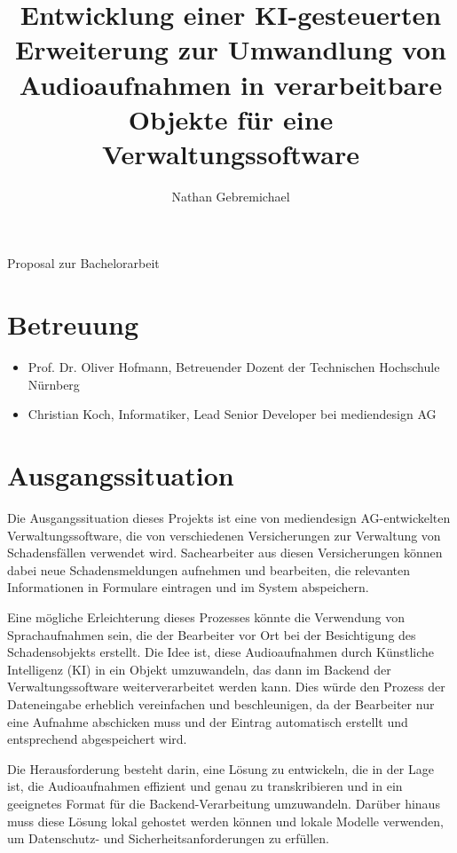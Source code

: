 \documentclass[12pt,a4paper,parskip=full]{scrartcl}
\title{Entwicklung einer KI-gesteuerten Erweiterung zur Umwandlung von Audioaufnahmen in verarbeitbare Objekte für eine Verwaltungssoftware}
\author{Nathan Gebremichael}
\date{}
\begin{document}
\makeatletter

{
    \centering
    {\Large Proposal zur Bachelorarbeit \par}
    \vspace*{1cm}
    {\LARGE \@title \par}
    \vspace*{2cm}
    {\large \@author \par}
}

\section*{Betreuung}
\begin{itemize}
    \item Prof. Dr. Oliver Hofmann, Betreuender Dozent der Technischen Hochschule Nürnberg
    \item Christian Koch, Informatiker, Lead Senior Developer bei mediendesign AG
\end{itemize}

\section*{Ausgangssituation}
Die Ausgangssituation dieses Projekts ist eine von mediendesign AG-entwickelten Verwaltungssoftware, die von verschiedenen Versicherungen zur Verwaltung von Schadensfällen verwendet wird.
Sachearbeiter aus diesen Versicherungen können dabei neue Schadensmeldungen aufnehmen und bearbeiten, die relevanten Informationen in Formulare eintragen und im System abspeichern.

Eine mögliche Erleichterung dieses Prozesses könnte die Verwendung von Sprachaufnahmen sein, die der Bearbeiter vor Ort bei der Besichtigung des Schadensobjekts erstellt.
Die Idee ist, diese Audioaufnahmen durch Künstliche Intelligenz (KI) in ein Objekt umzuwandeln, das dann im Backend der Verwaltungssoftware weiterverarbeitet werden kann.
Dies würde den Prozess der Dateneingabe erheblich vereinfachen und beschleunigen, da der Bearbeiter nur eine Aufnahme abschicken muss und der Eintrag automatisch erstellt und entsprechend abgespeichert wird.

Die Herausforderung besteht darin, eine Lösung zu entwickeln, die in der Lage ist, die Audioaufnahmen effizient und genau zu transkribieren und in ein geeignetes Format für die Backend-Verarbeitung umzuwandeln.
Darüber hinaus muss diese Lösung lokal gehostet werden können und lokale Modelle verwenden, um Datenschutz- und Sicherheitsanforderungen zu erfüllen.
\end{document}
